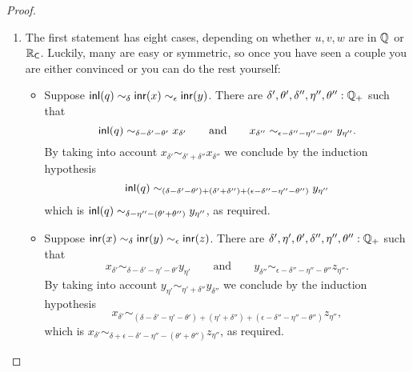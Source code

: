 \begin{proof}
  \mbox{}
  \begin{enumerate}
  \item 
    The first statement has eight cases, depending on whether $u, v, w$ are in $\mathbb{Q}$ or
    $\mathbb{R}_\mathsf{C}$. Luckily, many are easy or symmetric, so once you have seen a couple you are
    either convinced or you can do the rest yourself:
    \begin{itemize}
    \item Suppose $\mathsf{inl}(q) \sim_\delta \mathsf{inr}(x) \sim_\epsilon \mathsf{inr}(y)$. There are $\delta',
      \theta', \delta'', \eta'', \theta'' : \mathbb{Q}_{+}$ such that
      \begin{equation*}
        \mathsf{inl}(q)
        \sim_{\delta - \delta' - \theta'}
        x_{\delta'}
        \qquad\text{and}\qquad
        x_{\delta''}
        \sim_{\epsilon - \delta'' - \eta'' - \theta''}
        y_{\eta''}.
      \end{equation*}
      By taking into account $x_{\delta'} \sim_{\delta' + \delta''} x_{\delta''}$ we
      conclude by the induction hypothesis
      \begin{equation*}
        \mathsf{inl}(q) \sim_{(\delta - \delta' - \theta') + (\delta' + \delta'') + (\epsilon -
          \delta'' - \eta'' - \theta'')} y_{\eta''}
      \end{equation*}
      which is $\mathsf{inl}(q) \sim_{\delta - \eta'' - (\theta' + \theta'')} y_{\eta''}$, as required.
    \item Suppose $\mathsf{inr}(x) \sim_\delta \mathsf{inr}(y) \sim_\epsilon \mathsf{inr}(z)$. There are $\delta',
      \eta', \theta', \delta'', \eta'', \theta'' : \mathbb{Q}_{+}$ such that
      \begin{equation*}
        x_{\delta'} \sim_{\delta - \delta' - \eta' - \theta'} y_{\eta'}
        \qquad\text{and}\qquad
        y_{\delta''} \sim_{\epsilon - \delta'' - \eta'' - \theta''} z_{\eta''}.
      \end{equation*}
      By taking into account $y_{\eta'} \sim_{\eta' + \delta''} y_{\delta''}$ we conclude
      by the induction hypothesis
      \begin{equation*}
        x_{\delta'} \sim_{(\delta - \delta' - \eta' - \theta') + (\eta' + \delta'') +
          (\epsilon - \delta'' - \eta'' - \theta'')} z_{\eta''},
      \end{equation*}
      which is $x_{\delta'} \sim_{\delta + \epsilon - \delta' - \eta'' - (\theta' +
        \theta'')} z_{\eta''}$, as required.      

\end{itemize}
\end{enumerate}
\end{proof}
